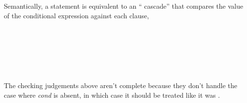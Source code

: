 \begin{Description}
Semantically, a  statement is equivalent to an `` cascade'' that compares the value of the conditional expression against each  clause,
\end{Description}



\begin{Syntax}
	 \\
		 \code{(} \\
		\SynOpt \code{;} \\
		\SynOpt \code{;} \\
		\SynOpt \code{)} \\
\end{Syntax}


\begin{Checking}
\end{Checking}

\begin{Incomplete}
The checking judgements above aren't complete because they don't handle the case where \emph{cond} is absent, in which case it should be treated like it was .
\end{Incomplete}



\begin{Syntax}
	 \\
		 \code{(}
		\SynOpt \code{)}
\end{Syntax}


\begin{Checking}
\end{Checking}

